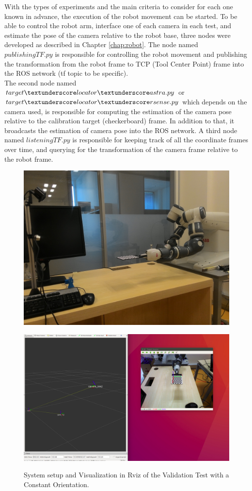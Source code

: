 With the types of experiments and the main criteria to consider for each one known in advance, the execution of the robot movement can be started. To be able to control the robot arm, interface one of each camera in each test, and estimate the pose of the camera relative to the robot base, three nodes were developed as described in Chapter \ref{chap:robot}. The node named $publishingTF.py$ is responsible for controlling the robot movement and publishing the transformation from the robot frame to TCP (Tool Center Point) frame into the ROS network (tf topic to be specific). \\
The second node named $target\textunderscore locator \textunderscore astra.py$ or $target\textunderscore locator \textunderscore rsense.py$  which depends on the camera used, is responsible  for computing the estimation of the camera pose relative to the calibration target (checkerboard) frame. In addition to that, it broadcasts the estimation of camera pose into the ROS network. A third node named $listeningTF.py$ is responsible for keeping track of all the coordinate frames over time, and querying for the transformation of the camera frame relative to the robot frame.

\begin{figure}[htp]
\begin{center}
{
  \includegraphics[clip,width=0.6\columnwidth]{images/ext1.jpg}
}
\end{center}
\begin{center}
{
  \includegraphics[clip,width=0.7\columnwidth]{images/ext2.jpg}
}
\end{center}
\caption{System setup and Visualization in Rviz of the Validation Test with a Constant Orientation.}
\label{setupext1}
\end{figure}



